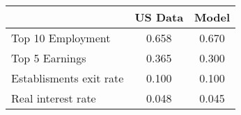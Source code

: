  \begin{tabular}{lcc} \hline 
  & US Data & Model \\ 
 \hline 
Top 10 Employment  &    0.658 &    0.670 \\ 
Top 5 Earnings  &    0.365 &    0.300 \\ 
Establisments exit rate  &    0.100 &    0.100 \\ 
Real interest rate  &    0.048 &    0.045 \\ 
\hline 
 \end{tabular} 
